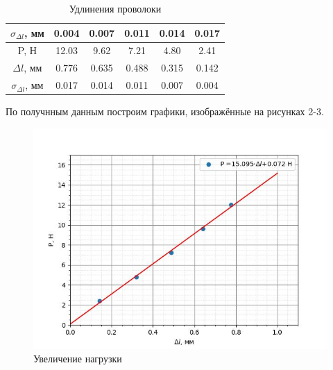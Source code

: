 \documentclass[a4paper,12 pt]{article}
\begin{document}
\begin{enumerate}
\begin{table}[H]
\begin{tabular}{|c|c|c|c|c|c|}
            $\sigma_{\Delta l}$, мм & 0.004 & 0.007 & 0.011 & 0.014 & 0.017\\
            \hline
            \hline
            P, Н & 12.03 & 9.62 & 7.21 & 4.80 & 2.41 \\
            \hline
            $\Delta l$, мм & 0.776 & 0.635 & 0.488 & 0.315 & 0.142 \\
            \hline
            $\sigma_{\Delta l}$, мм & 0.017 & 0.014 & 0.011 & 0.007 & 0.004\\
            \hline
        \end{tabular}
        \caption{Удлинения проволоки}
    \end{table}
    По получнным данным построим графики, изображённые на рисунках 2-3.

    \begin{figure}[H]
        \centering
        \includegraphics[scale = 0.7]{up.jpg}
        \caption{Увеличение нагрузки}
    \end{figure}


\end{enumerate}
\end{document}
